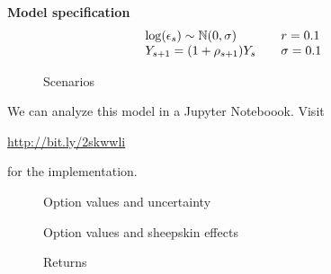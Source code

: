 \begin{frame}\textbf{Model specification}
\begin{align*}\begin{array}{l@{\qquad}l}
\log(\epsilon_s) \sim \N(0, \sigma) & r = 0.1   \\
Y_{s + 1} = (1 + \rho_{s + 1}) Y_s & \sigma = 0.1 \\
\end{array}\end{align*}
\end{frame}
\begin{frame}
\begin{figure}[htp]\centering
\caption{Scenarios}
\end{figure}
\end{frame}
\begin{frame}
We can analyze this model in a Jupyter Noteboook. Visit
\begin{center}
\url{http://bit.ly/2skwwli}
\end{center}
for the implementation.
\end{frame}
\begin{frame}
\begin{figure}[htp]\centering
\caption{Option values and uncertainty}
\end{figure}
\end{frame}
\begin{frame}
\begin{figure}[htp]\centering
\caption{Option values and sheepskin effects}
\end{figure}
\end{frame}
\begin{frame}
\begin{figure}[htp]\centering
\caption{Returns}
\end{figure}
\end{frame}
